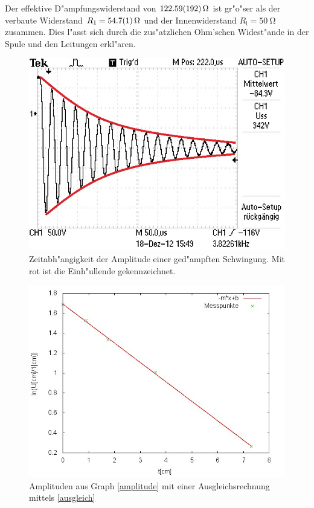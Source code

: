 	Der effektive D"ampfungswiderstand von $\SI{122.59 (192)}{\ohm}$ ist gr"o"ser als der verbaute Widerstand $R_\mathrm{1} = \SI{54.7 (1)}{\ohm}$ und der Innenwiderstand $R_\mathrm{i} = \SI{50}{\ohm}$ zusammen. Dies l"asst sich durch die zus"atzlichen Ohm'schen Widest"ande in der Spule und den Leitungen erkl"aren.

	\begin{figure}[htbp]
		\centering
		\includegraphics[width = 12cm]{img/F0006TEK.jpg}
		\caption{Zeitabh"angigkeit der Amplitude einer ged"ampften Schwingung. Mit rot ist die Einh"ullende gekennzeichnet.}
		\label{amplitude}
	\end{figure}

	\begin{figure}[htbp]
		\centering
		\includegraphics[width = 12cm]{img/graph_a_2.jpg}
		\caption{Amplituden aus Graph \eqref{amplitude} mit einer Ausgleichsrechnung mittels \eqref{ausgleich}}
		\label{amplitude_fit}
	\end{figure}

